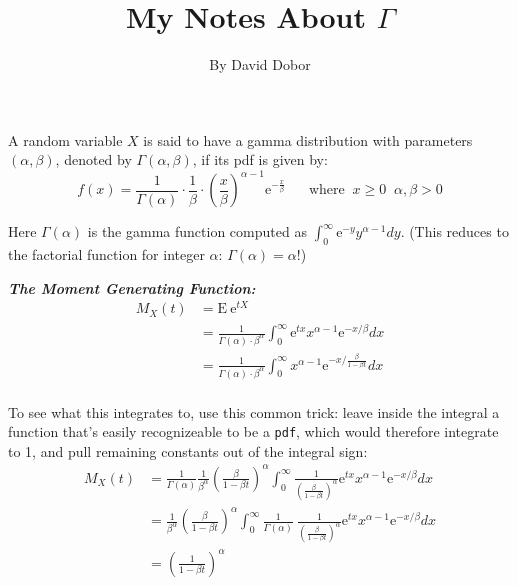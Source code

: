 \documentclass[12pt]{article}
\begin{document}
 \renewcommand{\arraystretch}{1.3}

 
\title{My Notes About $\Gamma$}%
\author{By David Dobor} %
\date{}

\maketitle
 A random variable $X$ is said to have a gamma distribution with parameters $(\alpha, \beta)$, denoted by  $\Gamma(\alpha, \beta)$, if its  pdf is given by:
$$
		f(x) = \frac{1}{\Gamma({\alpha})} \cdot \frac{1}{\beta} \cdot  \left( \frac{x}{\beta}\right)^{\alpha - 1} \mathrm{e}^{-\frac{x}{\beta}} \;\;\;\;\;\; \text{where} \;\;  x \ge 0 \;\; \alpha, \beta > 0
$$

Here $\Gamma(\alpha)$ is the gamma function computed as $\int_0^{\infty} \mathrm{e}^{-y} y^{\alpha - 1} dy$. (This reduces to the factorial function for integer $\alpha$: $\Gamma(\alpha) = \alpha!$)


\bigskip

\textbf{\color{TealBlue}\emph{The Moment Generating Function:} } 
\begin{align*}
M_X(t) &= \mathrm{E} \: \mathrm{e}^{tX} \\ 
&=  \frac{1}{\Gamma(\alpha) \cdot \beta^{\alpha}} \int_0^{\infty} \mathrm{e}^{tx} x^{\alpha - 1} \mathrm{e}^{-x/\beta} dx\\
&=  \frac{1}{\Gamma(\alpha) \cdot \beta^{\alpha}} \int_0^{\infty}  x^{\alpha - 1} \mathrm{e}^{ - x/ \frac{\beta}{1 - \beta t }} dx \\
\end{align*}

To see what this integrates to, use this common trick: leave inside the integral a function that's easily recognizeable to be a \texttt{pdf}, which
would therefore integrate to 1, and pull remaining constants out of the integral sign:
\begin{align*}
M_X(t) &= \frac{1}{\Gamma(\alpha)} \frac{1}{\beta^{\alpha}}\left( \frac{\beta}{1 - \beta t} \right)^\alpha \int_0^{\infty} \frac{1} { \left( \frac{\beta}{1 - \beta t} \right)^\alpha} \mathrm{e}^{tx} x^{\alpha - 1} \mathrm{e}^{-x/\beta} dx\\
 &= \frac{1}{\beta^{\alpha}}\left( \frac{\beta}{1 - \beta t} \right)^\alpha \int_0^{\infty} \frac{1}{\Gamma(\alpha)} \: \frac{1} { \left( \frac{\beta}{1 - \beta t} \right)^\alpha} \mathrm{e}^{tx} x^{\alpha - 1} \mathrm{e}^{-x/\beta} dx\\
&= \left( \frac{1} { 1 - \beta t } \right)^{\alpha}
\end{align*}
\end{document}
